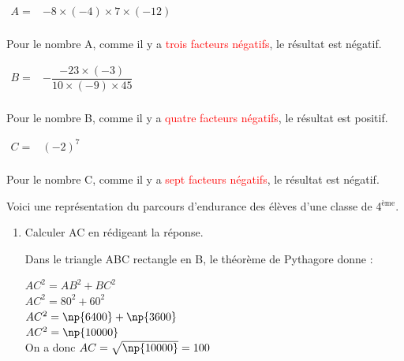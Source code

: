 \documentclass[a4paper]{book}
\begin{document}
{\begin{exercice}
\begin{enumerate}[leftmargin=*]
            \begin{minipage}{0.30\linewidth}
                $\begin{array}{ll}
                    A = & -8\times(-4)\times7\times(-12) \\[1ex]
                \end{array}$

                Pour le nombre A, comme il y a \textcolor{red}{trois facteurs négatifs}, le résultat est négatif.
            \end{minipage}
            \hfill
            \begin{minipage}{0.30\linewidth}
                $\begin{array}{ll}
                    B = & -\dfrac{-23\times(-3)}{10\times(-9)\times45} \\[1ex]
                \end{array}$    

                Pour le nombre B, comme il y a \textcolor{red}{quatre facteurs négatifs}, le résultat est positif.
            \end{minipage}
            \hfill
            \begin{minipage}[t]{0.30\linewidth}
                $\begin{array}{ll}
                    C = & (-2)^7 \\[1ex]
                \end{array}$

                Pour le nombre C, comme il y a \textcolor{red}{sept facteurs négatifs}, le résultat est négatif. 
            \end{minipage}
            
        \end{enumerate}
    \end{exercice}


    \begin{exercice}
        \begin{minipage}{0.50\linewidth}
            Voici une représentation du parcours d'endurance des élèves d'une classe de 4$^\text{ème}$.

            \begin{enumerate}
                \item Calculer AC en rédigeant la réponse.

                Dans le triangle ABC rectangle en B, le théorème de Pythagore donne : 

                $AC^2=AB^2+BC^2$\\
                $AC^2=80^2+60^2$\\
                $AC^2=\np{6400}+\np{3600}$\\
                $AC^2=\np{10000}$\\
                On a donc $AC=\sqrt{\np{10000}}=100$
                

\end{enumerate}
\end{minipage}
\end{exercice}}
\end{document}

